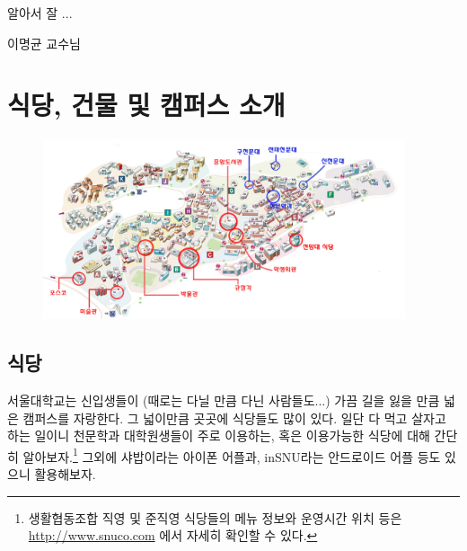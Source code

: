 \epigraph{알아서 잘 ...}
{{\textsc{이명균 교수님}}}

\section{식당, 건물 및 캠퍼스 소개}
\begin{figure}
\begin{center}
\includegraphics[width=0.95\textwidth]{./Figures/campus_map.jpg}
\end{center}
\end{figure}

\subsection{식당}
서울대학교는 신입생들이 (때로는 다닐 만큼 다닌 사람들도...) 가끔 길을 잃을 만큼
넓은 캠퍼스를 자랑한다.  그 넓이만큼 곳곳에 식당들도 많이 있다. 일단 다 먹고
살자고 하는 일이니 천문학과 대학원생들이 주로 이용하는, 혹은 이용가능한 식당에
대해 간단히 알아보자.\footnote{생활협동조합 직영 및 준직영 식당들의 메뉴 정보와
  운영시간 위치 등은 \url{http://www.snuco.com} 에서 자세히 확인할 수 있다.}
그외에 샤밥이라는 아이폰 어플과, inSNU라는 안드로이드 어플 등도 있으니
활용해보자.

